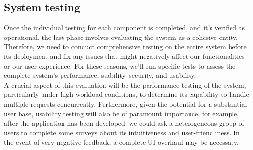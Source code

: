 \documentclass[../DD.tex]{subfiles}
\begin{document}
    \subsection{System testing}
        Once the individual testing for each component is completed, and it's verified as operational, the last phase involves evaluating the system as a cohesive entity. Therefore, we need to conduct comprehensive testing on the entire system before its deployment and fix any issues that might negatively affect our functionalities or our user experience. For these reasons, we'll run specific tests to assess the complete system's performance, stability, security, and usability.\\
        A crucial aspect of this evaluation will be the performance testing of the system, particularly under high workload conditions, to determine its capability to handle multiple requests concurrently. Furthermore, given the potential for a substantial user base, usability testing will also be of paramount importance, for example, after the application has been developed, we could ask a heterogeneous group of users to complete some surveys about its intuitiveness and user-friendliness. In the event of very negative feedback, a complete UI overhaul may be necessary.
\end{document}
